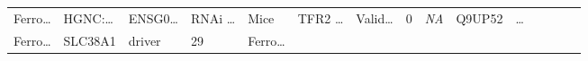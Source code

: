 \documentclass[
]{article}
\begin{document}
\begin{longtable}[]{@{}lllllllllllllll@{}}
\begin{minipage}[t]{0.05\columnwidth}
Ferro\ldots{}\strut
\end{minipage} & \begin{minipage}[t]{0.05\columnwidth}\raggedright
HGNC:\ldots{}\strut
\end{minipage} & \begin{minipage}[t]{0.05\columnwidth}\raggedright
ENSG0\ldots{}\strut
\end{minipage} & \begin{minipage}[t]{0.05\columnwidth}\raggedright
RNAi \ldots{}\strut
\end{minipage} & \begin{minipage}[t]{0.05\columnwidth}\raggedright
Mice\strut
\end{minipage} & \begin{minipage}[t]{0.05\columnwidth}\raggedright
TFR2 \ldots{}\strut
\end{minipage} & \begin{minipage}[t]{0.05\columnwidth}\raggedright
Valid\ldots{}\strut
\end{minipage} & \begin{minipage}[t]{0.05\columnwidth}\raggedright
0\strut
\end{minipage} & \begin{minipage}[t]{0.05\columnwidth}\raggedright
\emph{NA}\strut
\end{minipage} & \begin{minipage}[t]{0.05\columnwidth}\raggedright
Q9UP52\strut
\end{minipage} & \begin{minipage}[t]{0.02\columnwidth}\raggedright
\ldots{}\strut
\end{minipage}\tabularnewline
\begin{minipage}[t]{0.05\columnwidth}\raggedright
Ferro\ldots{}\strut
\end{minipage} & \begin{minipage}[t]{0.05\columnwidth}\raggedright
SLC38A1\strut
\end{minipage} & \begin{minipage}[t]{0.04\columnwidth}\raggedright
driver\strut
\end{minipage} & \begin{minipage}[t]{0.02\columnwidth}\raggedright
29\strut
\end{minipage} & \begin{minipage}[t]{0.05\columnwidth}\raggedright
Ferro\ldots{}\strut
\end{minipage} & \begin{minipage}[t]{0.05\columnwidth}\raggedright

\end{minipage}
\end{longtable}
\end{document}
